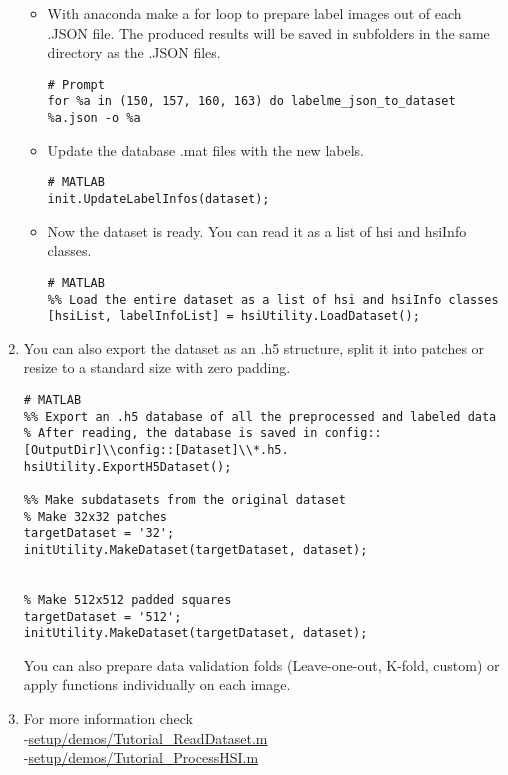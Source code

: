 \documentclass{foxelas_report}
\begin{document}
\begin{enumerate}
\begin{itemize}
\item With anaconda make a for loop to prepare label images out of each .JSON file. The produced results will be saved in subfolders in the same directory as the .JSON files. 

\begin{lstlisting}
# Prompt
for %a in (150, 157, 160, 163) do labelme_json_to_dataset %a.json -o %a
\end{lstlisting}

\item Update the database .mat files with the new labels.

\begin{lstlisting}
# MATLAB
init.UpdateLabelInfos(dataset);
\end{lstlisting}

\item Now the dataset is ready. You can read it as a list of hsi and hsiInfo classes.

\begin{lstlisting}
# MATLAB
%% Load the entire dataset as a list of hsi and hsiInfo classes
[hsiList, labelInfoList] = hsiUtility.LoadDataset();
\end{lstlisting}
\end{itemize}


\item You can also export the dataset as an .h5 structure, split it into patches or resize to a standard size with zero padding.

\begin{lstlisting}
# MATLAB
%% Export an .h5 database of all the preprocessed and labeled data
% After reading, the database is saved in config::[OutputDir]\\config::[Dataset]\\*.h5.
hsiUtility.ExportH5Dataset();

%% Make subdatasets from the original dataset
% Make 32x32 patches
targetDataset = '32';
initUtility.MakeDataset(targetDataset, dataset);


% Make 512x512 padded squares
targetDataset = '512';
initUtility.MakeDataset(targetDataset, dataset);

\end{lstlisting}

You can also prepare data validation folds (Leave-one-out, K-fold, custom) or apply functions individually on each image. 

\item For more information check \\
-\url{setup/demos/Tutorial\_ReadDataset.m}\\
-\url{setup/demos/Tutorial\_ProcessHSI.m}

\end{enumerate}


%
\end{document}
